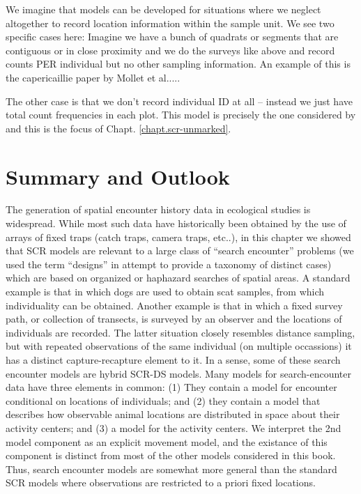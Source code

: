 We imagine that models can be developed for
situations where we neglect
altogether to record location information within the sample unit.
We see two specific cases here:
Imagine we have a bunch of quadrats or segments that are contiguous or
in close proximity
and we do the surveys like above and record counts PER individual  but
no other sampling information. An example of this is the capericaillie
paper by Mollet et al.....

The other case is that we don't record individual ID at all -- instead
we just have total count frequencies in each plot.
This model is precisely the one considered by
\citep{chandler_royle:2012} and this is the focus of Chapt. \ref{chapt.scr-unmarked}.





\section{Summary and Outlook}

The generation of spatial encounter history data in ecological studies
is widespread. While most such data have historically been obtained by
the use of arrays of fixed traps (catch traps, camera traps, etc..),
in this chapter we showed that SCR models are relevant to a large
class of ``search encounter'' problems (we used the term ``designs''
in attempt to provide a taxonomy of distinct cases) which are based on
organized or haphazard searches of spatial areas. A standard example
is that in which dogs are used to obtain scat samples, from which
individuality can be obtained. Another example is that in which a
fixed survey path, or collection of transects, is surveyed by an
observer and the locations of individuals are recorded. The latter
situation closely resembles distance sampling, but with repeated
observations of the same individual (on multiple occassions) it has a
distinct capture-recapture element to it. In a sense, some of these
search encounter models are hybrid SCR-DS models.
Many models 
 for search-encounter data have three elements in common:
(1) They contain a model for encounter conditional on 
locations of individuals; and (2) they contain a model that describes
how observable animal locations are distributed in space about their
activity centers; and (3) a model for the activity centers.  We
interpret the 2nd model component 
as an explicit movement model, and the existance of this component 
is distinct from most of the
other models considered in this book. Thus, search encounter models 
are somewhat more general than the standard SCR models
where observations are restricted to a priori fixed locations.


